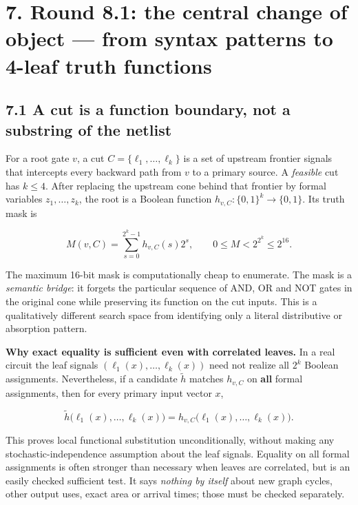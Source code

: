 \documentclass[a4paper,10pt]{article}
\theoremstyle{definition}
\theoremstyle{remark}
\begin{document}
\section{7. Round 8.1: the central change of object --- from syntax patterns to 4-leaf truth functions}\label{round-8.1-the-central-change-of-object-from-syntax-patterns-to-4-leaf-truth-functions}

\subsection{7.1 A cut is a function boundary, not a substring of the netlist}\label{a-cut-is-a-function-boundary-not-a-substring-of-the-netlist}

For a root gate \(v\), a cut \(C=\{\ell_1,\ldots,\ell_k\}\) is a set of upstream frontier signals that intercepts every backward path from \(v\) to a primary source. A \emph{feasible} cut has \(k\le4\). After replacing the upstream cone behind that frontier by formal variables \(z_1,\ldots,z_k\), the root is a Boolean function \(h_{v,C}:\{0,1\}^k\rightarrow\{0,1\}\). Its truth mask is

\[
M(v,C)=\sum_{s=0}^{2^k-1} h_{v,C}(s)2^s,
\qquad 0\le M<2^{2^k}\le2^{16}.
\]

The maximum 16-bit mask is computationally cheap to enumerate. The mask is a \emph{semantic bridge}: it forgets the particular sequence of AND, OR and NOT gates in the original cone while preserving its function on the cut inputs. This is a qualitatively different search space from identifying only a literal distributive or absorption pattern.

\textbf{Why exact equality is sufficient even with correlated leaves.} In a real circuit the leaf signals \((\ell_1(x),\ldots,\ell_k(x))\) need not realize all \(2^k\) Boolean assignments. Nevertheless, if a candidate \(\tilde h\) matches \(h_{v,C}\) on \textbf{all} formal assignments, then for every primary input vector \(x\),

\[
\tilde h\bigl(\ell_1(x),\ldots,\ell_k(x)\bigr)
=h_{v,C}\bigl(\ell_1(x),\ldots,\ell_k(x)\bigr).
\]

This proves local functional substitution unconditionally, without making any stochastic-independence assumption about the leaf signals. Equality on all formal assignments is often stronger than necessary when leaves are correlated, but is an easily checked sufficient test. It says \emph{nothing by itself} about new graph cycles, other output uses, exact area or arrival times; those must be checked separately.
\end{document}
